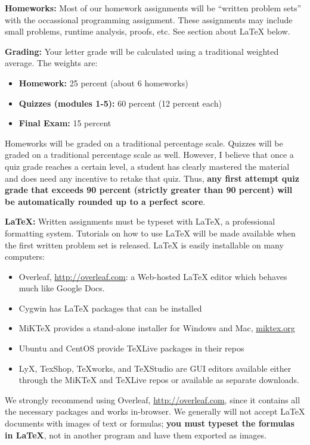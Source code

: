 \documentclass[12pt]{article}
\begin{document}
\textbf{Homeworks:} Most of our homework assignments will be ``written problem sets'' with the occassional programming assignment. These assignments may include small problems, runtime analysis, proofs, etc.   See section about \LaTeX{} below.

\textbf{Grading:} Your letter grade will be calculated using a traditional weighted average. The weights are:

\begin{itemize}
\item \textbf{Homework:} 25 percent (about 6 homeworks)
\item \textbf{Quizzes (modules 1-5):} 60 percent (12 percent each)
\item \textbf{Final Exam:} 15 percent
\end{itemize}

Homeworks will be graded on a traditional percentage scale. Quizzes will be graded on a traditional percentage scale as well. However, I believe that once a quiz grade reaches a certain level, a student has clearly mastered the material and does need any incentive to retake that quiz. Thus, \textbf{any first attempt quiz grade that exceeds 90 percent (strictly greater than 90 percent) will be automatically rounded up to a perfect score}.


\textbf{\LaTeX:} Written assignments must be typeset with \LaTeX, a professional formatting system. Tutorials on how to use \LaTeX{} will be made available when the first written problem set is released. \LaTeX{} is easily installable on many computers: 
\begin{itemize}
    \item Overleaf, \url{http://overleaf.com}: a Web-hosted \LaTeX{} editor which behaves much like Google Docs.
    \item Cygwin has \LaTeX{} packages that can be installed
    \item MiKTeX provides a stand-alone installer for Windows and Mac, \url{miktex.org}
    \item Ubuntu and CentOS provide TeXLive packages in their repos
    \item LyX, TexShop, TeXworks, and TeXStudio are GUI editors available either through the MiKTeX and TeXLive repos or available as separate downloads.
\end{itemize}
We strongly recommend using Overleaf, \url{http://overleaf.com}, since it contains all the necessary packages and works in-browser. We generally will not accept \LaTeX{} documents with images of text or formulas; \textbf{you must typeset the formulas in \LaTeX}, not in another program and have them exported as images.
\end{document}
